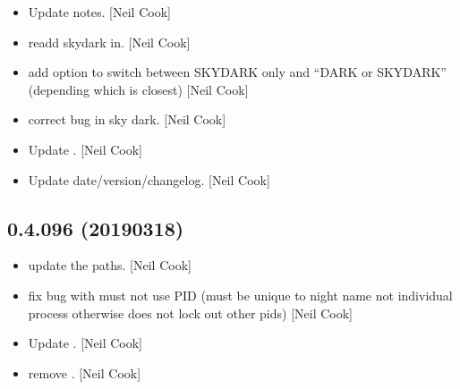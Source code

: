 \documentclass[a4paper,10pt,english]{report}
\begin{document}
\begin{itemize}
\begin{description}
\end{description}

\item {} 
Update notes. {[}Neil Cook{]}

\item {} 
 \sphinxhyphen{} re\sphinxhyphen{}add skydark in. {[}Neil Cook{]}

\item {} 
 \sphinxhyphen{} add option to switch between SKYDARK only
and “DARK or SKYDARK” (depending which is closest) {[}Neil Cook{]}

\item {} 
 \sphinxhyphen{} correct bug in sky dark. {[}Neil Cook{]}

\item {} 
Update . {[}Neil Cook{]}

\item {} 
Update date/version/changelog. {[}Neil Cook{]}

\end{itemize}


\subsection{0.4.096 (2019\sphinxhyphen{}03\sphinxhyphen{}18)}
\label{\detokenize{misc/changelog:id182}}\begin{itemize}
\item {} 
 \sphinxhyphen{} update the paths. {[}Neil Cook{]}

\item {} 
 \sphinxhyphen{} fix bug with  \sphinxhyphen{} must not use PID
(must be unique to night name not individual process otherwise does
not lock out other pids) {[}Neil Cook{]}

\item {} 
Update . {[}Neil Cook{]}

\item {} 
 \sphinxhyphen{} remove . {[}Neil Cook{]}

\end{itemize}
\end{document}
